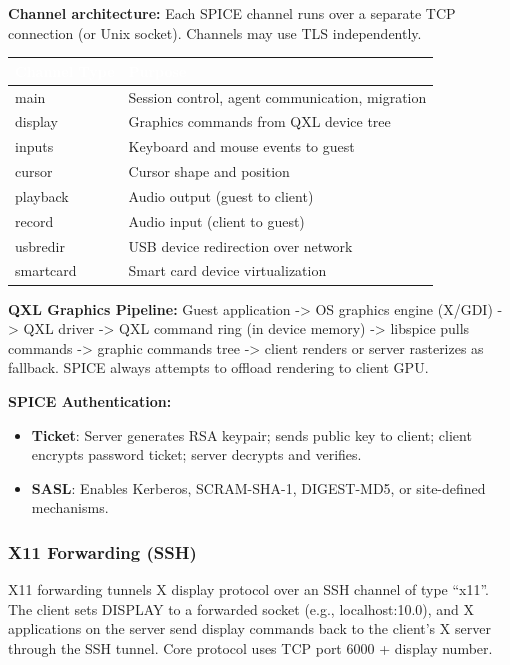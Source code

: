 \documentclass[11pt,letterpaper]{article}
\newcommand{\tableheader}[1]{\textbf{\sffamily\textcolor{white}{#1}}}
\begin{document}
\textbf{Channel architecture:} Each SPICE channel runs over a separate TCP connection (or Unix socket). Channels may use TLS independently.

\begin{center}
\begin{tabularx}{\textwidth}{L{3cm}X}
\toprule
{}
\tableheader{Channel Type} & \tableheader{Purpose} \\
\midrule
main & Session control, agent communication, migration \\
display & Graphics commands from QXL device tree \\
inputs & Keyboard and mouse events to guest \\
cursor & Cursor shape and position \\
playback & Audio output (guest to client) \\
record & Audio input (client to guest) \\
usbredir & USB device redirection over network \\
smartcard & Smart card device virtualization \\
\bottomrule
\end{tabularx}
\end{center}

\textbf{QXL Graphics Pipeline:} Guest application -> OS graphics engine (X/GDI) -> QXL driver -> QXL command ring (in device memory) -> libspice pulls commands -> graphic commands tree -> client renders or server rasterizes as fallback. SPICE always attempts to offload rendering to client GPU.

\textbf{SPICE Authentication:}
\begin{itemize}
\item \textbf{Ticket}: Server generates RSA keypair; sends public key to client; client encrypts password ticket; server decrypts and verifies.
\item \textbf{SASL}: Enables Kerberos, SCRAM-SHA-1, DIGEST-MD5, or site-defined mechanisms.
\end{itemize}

\subsubsection{X11 Forwarding (SSH)}

X11 forwarding tunnels X display protocol over an SSH channel of type ``x11''. The client sets DISPLAY to a forwarded socket (e.g., localhost:10.0), and X applications on the server send display commands back to the client's X server through the SSH tunnel. Core protocol uses TCP port 6000 + display number.
\end{document}
